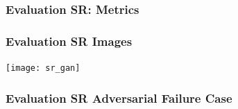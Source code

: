 \documentclass{beamer}
\begin{document}
\begin{frame} \frametitle{Evaluation SR: Metrics}

\end{frame}

\begin{frame} \frametitle{Evaluation SR Images}
  \centering
 \texttt{[image: sr\_gan]}
\end{frame}

\begin{frame} \frametitle{Evaluation SR Adversarial Failure Case}
  
\end{frame}
\end{document}
